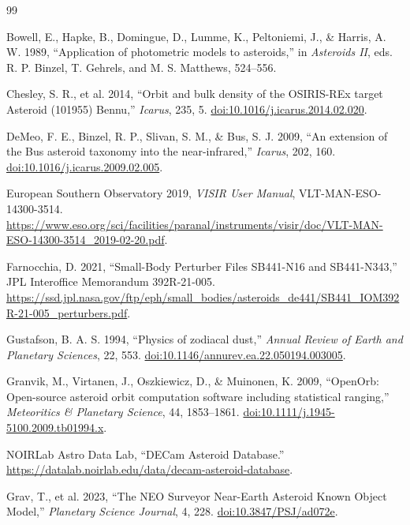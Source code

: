 \clearpage
\ifdefined\APPENDIXCBOOK
\renewcommand{\bibname}{References}
\else
\renewcommand{\refname}{References}
\fi
\begin{thebibliography}{99}
\color{cText}

Bowell, E., Hapke, B., Domingue, D., Lumme, K., Peltoniemi, J.,
\& Harris, A. W. 1989,
``Application of photometric models to asteroids,''
in \textit{Asteroids II}, eds. R. P. Binzel, T. Gehrels, and M. S. Matthews,
524--556.

Chesley, S. R., et al. 2014,
``Orbit and bulk density of the OSIRIS-REx target Asteroid (101955) Bennu,''
\textit{Icarus}, 235, 5.
\href{https://doi.org/10.1016/j.icarus.2014.02.020}{doi:10.1016/j.icarus.2014.02.020}.

DeMeo, F. E., Binzel, R. P., Slivan, S. M., \& Bus, S. J. 2009,
``An extension of the Bus asteroid taxonomy into the near-infrared,''
\textit{Icarus}, 202, 160.
\href{https://doi.org/10.1016/j.icarus.2009.02.005}{doi:10.1016/j.icarus.2009.02.005}.

European Southern Observatory 2019,
\textit{VISIR User Manual}, VLT-MAN-ESO-14300-3514.
\url{https://www.eso.org/sci/facilities/paranal/instruments/visir/doc/VLT-MAN-ESO-14300-3514_2019-02-20.pdf}.

Farnocchia, D. 2021,
``Small-Body Perturber Files SB441-N16 and SB441-N343,''
JPL Interoffice Memorandum 392R-21-005.
\url{https://ssd.jpl.nasa.gov/ftp/eph/small_bodies/asteroids_de441/SB441_IOM392R-21-005_perturbers.pdf}.

Gustafson, B. A. S. 1994,
``Physics of zodiacal dust,''
\textit{Annual Review of Earth and Planetary Sciences}, 22, 553.
\href{https://doi.org/10.1146/annurev.ea.22.050194.003005}
{doi:10.1146/annurev.ea.22.050194.003005}.

Granvik, M., Virtanen, J., Oszkiewicz, D., \& Muinonen, K. 2009,
``OpenOrb: Open-source asteroid orbit computation software including
statistical ranging,''
\textit{Meteoritics \& Planetary Science}, 44, 1853--1861.
\href{https://doi.org/10.1111/j.1945-5100.2009.tb01994.x}
{doi:10.1111/j.1945-5100.2009.tb01994.x}.

NOIRLab Astro Data Lab,
``DECam Asteroid Database.''
\url{https://datalab.noirlab.edu/data/decam-asteroid-database}.

Grav, T., et al. 2023,
``The NEO Surveyor Near-Earth Asteroid Known Object Model,''
\textit{Planetary Science Journal}, 4, 228.
\href{https://doi.org/10.3847/PSJ/ad072e}{doi:10.3847/PSJ/ad072e}.


\end{thebibliography}
